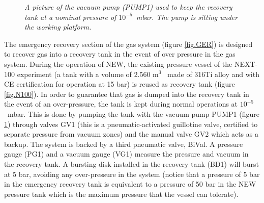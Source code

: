 \begin{figure}[hpt!]
    \bigskip
    \begin{center}\leavevmode
        \caption{\textit{A picture of the vacuum pump (PUMP1) used to keep the recovery tank at a 
        nominal pressure of $10^{-5}$~mbar. The pump is sitting under the working platform.}}
        \label{fig.P1}
    \end{center}
\end{figure}


The emergency recovery section of the gas system (figure \ref{fig.GER}) is designed to recover gas into a recovery tank in the event of over pressure in the gas system. During the operation of NEW, the existing pressure vessel of the NEXT-100 experiment (a tank with a volume of 2.560 m$^3$~ made of 316Ti alloy and with CE certification for operation at 15 bar) is reused as recovery tank (figure \ref{fig.N100}). In order to guarantee that gas is dumped into the recovery tank in the event of an over-pressure, the tank is kept during normal operations at $10^{-5}$~mbar. This is done by pumping the tank with the vacuum pump PUMP1 (figure \ref{fig.P1})
through valves GV1 (this is a pneumatic-activated guillotine valve, certified to separate pressure from vacuum zones) and the manual valve GV2 which acts as a backup. The system is backed by a third pneumatic valve, BiVal. A pressure gauge (PG1) and a vacuum gauge (VG1) measure the pressure and vacuum in the recovery tank. A bursting disk installed in the recovery tank (BD1) will burst at 5 bar, avoiding any over-pressure in the system (notice that a pressure of 5 bar in the emergency recovery tank is equivalent to a pressure of 50 bar in the NEW pressure tank which is the maximum pressure that the vessel can tolerate). 

